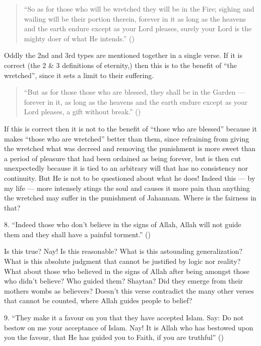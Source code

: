 \documentclass[12pt]{memoir}
\begin{document}
\begin{quote}
“So as for those who will be wretched they will be in the Fire;
sighing and wailing will be their portion therein,
forever in it as long as the heavens and the earth endure
except as your Lord pleases,
surely your Lord is the mighty doer of what He intends.”
()
\end{quote}

Oddly the 2nd and 3rd types are mentioned together in a single verse.
If it is correct (the 2 \& 3 definitions of eternity,)
then this is to the benefit of “the wretched”,
since it sets a limit to their suffering.

\begin{quote}
“But as for those those who are blessed, they shall be in the Garden —
forever in it, as long as the heavens and the earth endure
except as your Lord pleases, a gift without break.” ()
\end{quote}

If this is correct then it is not to the benefit of “those who are blessed”
because it makes “those who are wretched” better than them,
since refraining from giving the wretched what was decreed
and removing the punishment is more sweet than a period of pleasure
that had been ordained as being forever,
but is then cut unexpectedly because it is tied to an arbitrary will
that has no consistency nor continuity.
But He is not to be questioned about what he does!
Indeed this — by my life —
more intensely stings the soul and causes it more pain
than anything the wretched may suffer in the punishment of Jahannam.
Where is the fairness in that?

8. “Indeed those who don’t believe in the signs of Allah,
Allah will not guide them and they shall have a painful torment.”
()

Is this true? Nay! Is this reasonable?
What is this astounding generalization?
What is this absolute judgment that cannot be justified by logic nor reality?
What about those who believed in the signs of Allah
after being amongst those who didn’t believe?
Who guided them? Shaytan?
Did they emerge from their mothers wombs as believers?
Doesn’t this verse contradict the many other verses that cannot be counted,
where Allah guides people to belief?\fnmarksym[*]


9. “They make it a favour on you that they have accepted Islam.
Say: Do not bestow on me your acceptance of Islam.
Nay! It is Allah who has bestowed upon you the favour,
that He has guided you to Faith, if you are truthful” ()
\end{document}
